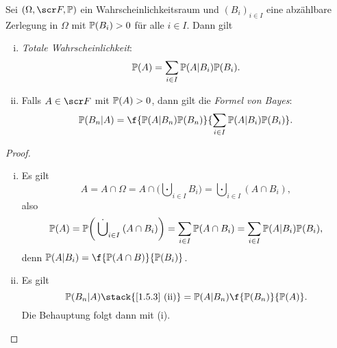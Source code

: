 \begin{st} \label{1.5.4}
	Sei $(\Omega, \scr F, \P)$ ein Wahrscheinlichkeitsraum und $(B_i)_{i\in I}$ eine abzählbare Zerlegung in $\Omega$ mit $\P(B_i) > 0$ für alle $i \in I$.
	Dann gilt
	\begin{enumerate}[(i)]
		\item
			\emph{Totale Wahrscheinlichkeit}:
			\[
				\P(A) = \sum_{i\in I} \P(A | B_i) \P(B_i).
			\]
		\item
			Falls $A \in \scr F$ mit $\P(A) > 0$, dann gilt die \emph{Formel von Bayes}:
			\[
				\P(B_n | A)
				= \f{\P(A|B_n) \P(B_n)}{\sum_{i\in I} \P(A|B_i) \P(B_i)}.
			\]
	\end{enumerate}
	\begin{proof}
		\begin{enumerate}[(i)]
			\item
				Es gilt
				\[
					A = A \cap \Omega = A \cap \bigg( \bigcupdot_{i \in I} B_i \bigg)
					= \bigcupdot_{i\in I} (A \cap B_i),
				\]
				also
				\[
					\P(A)
					= \P\bigg(\bigcupdot_{i\in I} (A \cap B_i)\bigg)
					= \sum_{i\in I}\P(A \cap B_i)
					= \sum_{i \in I} \P(A | B_i) \P(B_i),
				\]
				denn $\P(A | B_i) = \f {\P(A\cap B)}{\P(B_i)}$.
			\item
				Es gilt
				\[
					\P(B_n | A)
					\stack{\text{\ref{1.5.3} (ii)}}=
					\P(A | B_n) \f {\P(B_n)}{\P(A)}.
				\]
				Die Behauptung folgt dann mit (i).
		\end{enumerate}
	\end{proof}
\end{st}


